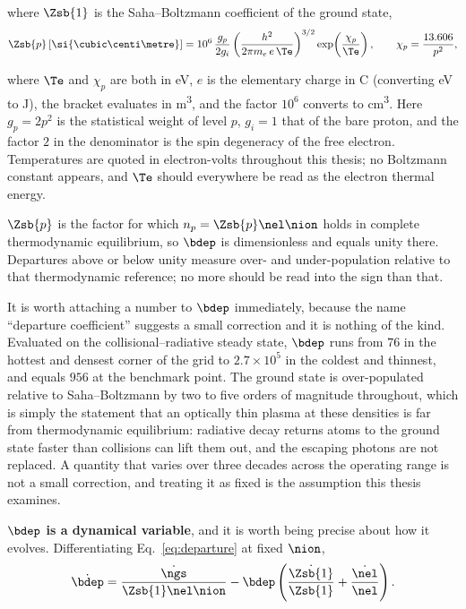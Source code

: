\noindent where $\Zsb{1}$ is the Saha--Boltzmann coefficient of the ground
state,
\begin{equation}
  \Zsb{p}\,[\si{\cubic\centi\metre}]
  = 10^{6}\,\frac{g_p}{2g_i}
  \left(\frac{h^2}{2\pi m_e\,e\,\Te}\right)^{3/2}
  \exp\!\left(\frac{\chi_p}{\Te}\right),
  \qquad \chi_p = \frac{13.606}{p^2},
  \label{eq:saha_boltzmann}
\end{equation}

\noindent where $\Te$ and $\chi_p$ are both in \si{\electronvolt}, $e$ is the
elementary charge in \si{\coulomb} (converting \si{\electronvolt} to
\si{\joule}), the bracket evaluates in \si{\cubic\metre}, and the factor
$10^{6}$ converts to \si{\cubic\centi\metre}. Here $g_p = 2p^2$ is the
statistical weight of level $p$, $g_i = 1$ that of the bare proton, and the
factor $2$ in the denominator is the spin degeneracy of the free electron.
Temperatures are quoted in electron-volts throughout this thesis; no Boltzmann
constant appears, and $\Te$ should everywhere be read as the electron thermal
energy.

$\Zsb{p}$ is the factor for which $n_p = \Zsb{p}\nel\nion$ holds in complete
thermodynamic equilibrium, so $\bdep$ is dimensionless and equals unity there.
Departures above or below unity measure over- and under-population relative to
that thermodynamic reference; no more should be read into the sign than that.

It is worth attaching a number to $\bdep$ immediately, because the name
``departure coefficient'' suggests a small correction and it is nothing of the
kind. Evaluated on the collisional--radiative steady state, $\bdep$ runs from
$76$ in the hottest and densest corner of the grid to $2.7\times10^{5}$ in the
coldest and thinnest, and equals $956$ at the benchmark point. The ground
state is over-populated relative to Saha--Boltzmann by two to five orders of
magnitude throughout, which is simply the statement that an optically thin
plasma at these densities is far from thermodynamic equilibrium: radiative decay
returns atoms to the ground state faster than collisions can lift them out, and
the escaping photons are not replaced. A quantity that varies over three decades
across the operating range is not a small correction, and treating it as fixed
is the assumption this thesis examines.

\textbf{$\bdep$ is a dynamical variable}, and it is worth being precise about
how it evolves. Differentiating Eq.~\eqref{eq:departure} at fixed $\nion$,
\begin{equation}
  \dot{\bdep}
  = \frac{\dot{\ngs}}{\Zsb{1}\nel\nion}
  - \bdep\left(\frac{\dot{\Zsb{1}}}{\Zsb{1}}
                + \frac{\dot{\nel}}{\nel}\right).
  \label{eq:b1_dynamics}
\end{equation}

